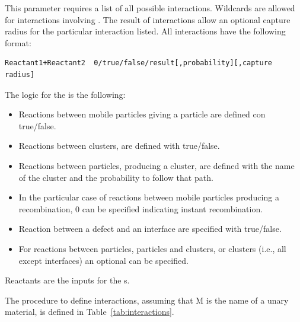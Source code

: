 This parameter requires a list of all possible interactions. Wildcards are allowed for interactions involving . The result of interactions allow an optional capture radius for the particular interaction listed. All interactions have the following format:
\begin{lstlisting}
Reactant1+Reactant2  0/true/false/result[,probability][,capture radius]
\end{lstlisting}

The logic for the  is the following:
\begin{itemize}
\item Reactions between mobile particles giving a particle are defined con true/false.
\item Reactions between clusters, are defined with true/false.
\item Reactions between particles, producing a cluster, are defined with the name of the cluster and the probability to follow that path.
\item In the particular case of reactions between mobile particles producing a recombination, 0 can be specified indicating instant recombination.
\item Reaction between a defect and an interface are specified with true/false.
\item For reactions between particles, particles and clusters, or clusters (i.e., all except interfaces) an optional  can be specified.
\end{itemize}

Reactants are the inputs for the s.  

The procedure to define interactions, assuming that M is the name of a unary material, is defined in Table~\ref{tab:interactions}.

